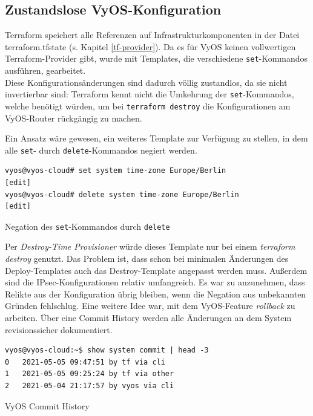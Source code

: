 \subsection{Zustandslose VyOS-Konfiguration}
Terraform speichert alle Referenzen auf Infrastrukturkomponenten in der Datei terraform.tfstate (s. Kapitel \ref{tf-provider}). Da es für VyOS keinen vollwertigen Terraform-Provider gibt, wurde mit Templates, die verschiedene \texttt{set}-Kommandos ausführen, gearbeitet.\\
Diese Konfigurationsänderungen sind dadurch völlig zustandlos, da sie nicht invertierbar sind: Terraform kennt nicht die Umkehrung der \texttt{set}-Kommandos, welche benötigt würden, um bei \texttt{terraform destroy} die Konfigurationen am VyOS-Router rückgängig zu machen.

Ein Ansatz wäre gewesen, ein weiteres Template zur Verfügung zu stellen, in dem alle \texttt{set}- durch \texttt{delete}-Kommandos negiert werden.\\
\begin{listing}[h]
\begin{verbatim}
vyos@vyos-cloud# set system time-zone Europe/Berlin
[edit]
vyos@vyos-cloud# delete system time-zone Europe/Berlin
[edit]
\end{verbatim}
\caption{Negation des \texttt{set}-Kommandos durch \texttt{delete}}
\label{set-delete-vyos}
\end{listing}\FloatBarrier
Per \textit{Destroy-Time Provisioner} würde dieses Template nur bei einem \textit{terraform destroy} genutzt\cite{destroytimeprovtf2021}. Das Problem ist, dass schon bei minimalen Änderungen des Deploy-Templates auch das Destroy-Template angepasst werden muss.
Außerdem sind die IPsec-Konfigurationen relativ umfangreich. Es war zu anzunehmen, dass Relikte aus der Konfiguration übrig bleiben, wenn die Negation aus unbekannten Gründen fehlschlug.
Eine weitere Idee war, mit dem VyOS-Feature \textit{rollback} zu arbeiten. Über eine Commit History werden alle Änderungen an dem System revisionssicher dokumentiert.
\begin{listing}[h]
\begin{verbatim}
vyos@vyos-cloud:~$ show system commit | head -3
0   2021-05-05 09:47:51 by tf via cli
1   2021-05-05 09:25:24 by tf via other
2   2021-05-04 21:17:57 by vyos via cli

\end{verbatim}
\caption{VyOS Commit History}
\label{commit-history-vyos}
\end{listing}\FloatBarrier
